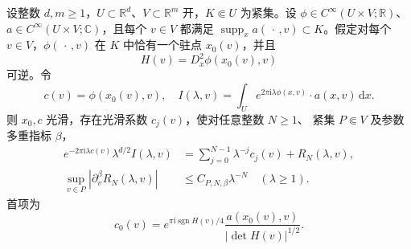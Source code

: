 \begin{proposition}[含参数的驻相展开]\label{b2:prop:21-parametric-stationary}
设整数 \(d,m\geq1\)，\(U\subset\mathbb R^d\)、\(V\subset\mathbb R^m\) 开，\(K\Subset U\) 为紧集。设
\(\phi\in C^\infty(U\times V;\mathbb R)\)、
\(a\in C^\infty(U\times V;\mathbb C)\)，且每个 \(v\in V\) 都满足
\(\operatorname{supp}_x a(\,\cdot\,,v)\subset K\)。假定对每个 \(v\in V\)，\(\phi(\,\cdot\,,v)\) 在 \(K\) 中恰有一个驻点 \(x_0(v)\)，并且
\[
 H(v)=D_x^2\phi(x_0(v),v)
\]
可逆。令
\[
 c(v)=\phi(x_0(v),v),
 \quad
 I(\lambda,v)=\int_U e^{2\pi\mathrm i\lambda\phi(x,v)}
                              \cdot a(x,v)\,\mathrm dx.
\]
则 \(x_0,c\) 光滑，存在光滑系数 \(c_j(v)\)，使对任意整数 \(N\geq1\)、
紧集 \(P\Subset V\) 及参数多重指标 \(\beta\)，
\[
 \begin{aligned}
 e^{-2\pi\mathrm i\lambda c(v)}\lambda^{d/2}I(\lambda,v)
 &=\sum_{j=0}^{N-1}\lambda^{-j}c_j(v)+R_N(\lambda,v),\\
 \sup_{v\in P}|\partial_v^\beta R_N(\lambda,v)|
 &\leq C_{P,N,\beta}\lambda^{-N}
 \quad(\lambda\geq1).
 \end{aligned}
\]
首项为
\[
 c_0(v)=e^{\pi\mathrm i\operatorname{sgn}H(v)/4}
           \frac{a(x_0(v),v)}{|\det H(v)|^{1/2}}.
\]
\end{proposition}
